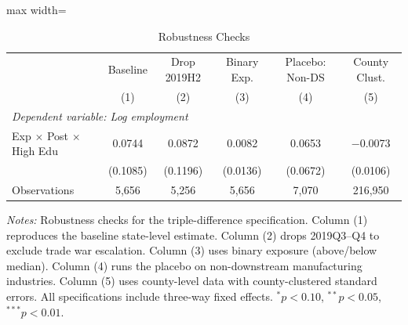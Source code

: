 \begin{table}[t]
\centering
\caption{Robustness Checks}
\label{tab:robustness}
\begin{adjustbox}{max width=\textwidth}
\begin{tabular}{lccccc}
\toprule
 & Baseline & Drop 2019H2 & Binary Exp. & Placebo: Non-DS & County Clust. \\
 & (1) & (2) & (3) & (4) & (5) \\
\midrule
\multicolumn{6}{l}{\textit{Dependent variable: Log employment}} \\[3pt]
 Exp $\times$ Post $\times$ High Edu & 0.0744 & 0.0872 & 0.0082 & 0.0653 & $-$0.0073 \\
  & (0.1085) & (0.1196) & (0.0136) & (0.0672) & (0.0106) \\
\midrule
 Observations & 5,656 & 5,256 & 5,656 & 7,070 & 216,950 \\
\bottomrule
\end{tabular}
\end{adjustbox}
\par\vspace{0.3em}
{\footnotesize \textit{Notes:} Robustness checks for the triple-difference specification. Column (1) reproduces the baseline state-level estimate. Column (2) drops 2019Q3--Q4 to exclude trade war escalation. Column (3) uses binary exposure (above/below median). Column (4) runs the placebo on non-downstream manufacturing industries. Column (5) uses county-level data with county-clustered standard errors. All specifications include three-way fixed effects. $^{*}p<0.10$, $^{**}p<0.05$, $^{***}p<0.01$.}
\end{table}
